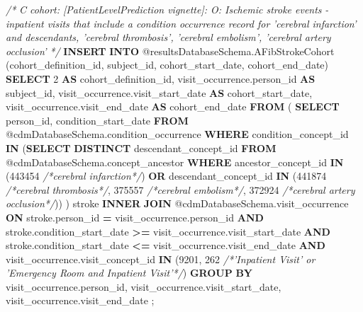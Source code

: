 \documentclass[
]{article}
\newenvironment{Shaded}{\begin{snugshade}}{\end{snugshade}}
\newcommand{\CommentTok}[1]{\textcolor[rgb]{0.56,0.35,0.01}{\textit{#1}}}
\newcommand{\DecValTok}[1]{\textcolor[rgb]{0.00,0.00,0.81}{#1}}
\newcommand{\KeywordTok}[1]{\textcolor[rgb]{0.13,0.29,0.53}{\textbf{#1}}}
\newcommand{\NormalTok}[1]{#1}
\newcommand{\OperatorTok}[1]{\textcolor[rgb]{0.81,0.36,0.00}{\textbf{#1}}}
\begin{document}
\begin{Shaded}
\begin{Highlighting}[]
  \CommentTok{/*}
\CommentTok{  C cohort:  [PatientLevelPrediction vignette]:  O: Ischemic stroke events}
\CommentTok{  - inpatient visits that include a condition occurrence record for }
\CommentTok{  'cerebral infarction' and descendants, 'cerebral thrombosis', }
\CommentTok{  'cerebral embolism', 'cerebral artery occlusion' }
\CommentTok{  */}
  \KeywordTok{INSERT} \KeywordTok{INTO}\NormalTok{ @resultsDatabaseSchema.AFibStrokeCohort (cohort_definition_id, }
\NormalTok{  subject_id, }
\NormalTok{  cohort_start_date, }
\NormalTok{  cohort_end_date)}
  \KeywordTok{SELECT} \DecValTok{2} \KeywordTok{AS}\NormalTok{ cohort_definition_id,}
\NormalTok{  visit_occurrence.person_id }\KeywordTok{AS}\NormalTok{ subject_id,}
\NormalTok{  visit_occurrence.visit_start_date }\KeywordTok{AS}\NormalTok{ cohort_start_date,}
\NormalTok{  visit_occurrence.visit_end_date }\KeywordTok{AS}\NormalTok{ cohort_end_date}
  \KeywordTok{FROM}  
\NormalTok{  (}
  \KeywordTok{SELECT}\NormalTok{ person_id, condition_start_date}
  \KeywordTok{FROM}\NormalTok{ @cdmDatabaseSchema.condition_occurrence}
  \KeywordTok{WHERE}\NormalTok{ condition_concept_id }\KeywordTok{IN}\NormalTok{ (}\KeywordTok{SELECT} \KeywordTok{DISTINCT}\NormalTok{ descendant_concept_id }\KeywordTok{FROM} 
\NormalTok{  @cdmDatabaseSchema.concept_ancestor }\KeywordTok{WHERE}\NormalTok{ ancestor_concept_id }\KeywordTok{IN} 
\NormalTok{  (}\DecValTok{443454} \CommentTok{/*cerebral infarction*/}\NormalTok{) }\KeywordTok{OR}\NormalTok{ descendant_concept_id }\KeywordTok{IN} 
\NormalTok{  (}\DecValTok{441874} \CommentTok{/*cerebral thrombosis*/}\NormalTok{, }\DecValTok{375557} \CommentTok{/*cerebral embolism*/}\NormalTok{, }
  \DecValTok{372924} \CommentTok{/*cerebral artery occlusion*/}\NormalTok{))}
\NormalTok{  ) stroke}
  \KeywordTok{INNER} \KeywordTok{JOIN}\NormalTok{ @cdmDatabaseSchema.visit_occurrence}
  \KeywordTok{ON}\NormalTok{ stroke.person_id }\OperatorTok{=}\NormalTok{ visit_occurrence.person_id}
  \KeywordTok{AND}\NormalTok{ stroke.condition_start_date }\OperatorTok{>=}\NormalTok{ visit_occurrence.visit_start_date}
  \KeywordTok{AND}\NormalTok{ stroke.condition_start_date }\OperatorTok{<=}\NormalTok{ visit_occurrence.visit_end_date}
  \KeywordTok{AND}\NormalTok{ visit_occurrence.visit_concept_id }\KeywordTok{IN}\NormalTok{ (}\DecValTok{9201}\NormalTok{, }\DecValTok{262} \CommentTok{/*'Inpatient Visit'  or }
\CommentTok{  'Emergency Room and Inpatient Visit'*/}\NormalTok{)}
  \KeywordTok{GROUP} \KeywordTok{BY}\NormalTok{ visit_occurrence.person_id, visit_occurrence.visit_start_date, }
\NormalTok{  visit_occurrence.visit_end_date}
\NormalTok{  ;}
  
\end{Highlighting}
\end{Shaded}
\end{document}
